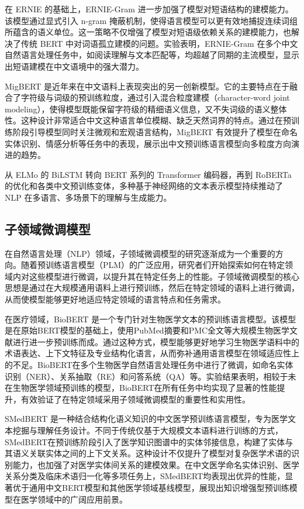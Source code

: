 \documentclass[12pt, a4paper]{ctexart}
\begin{document}
在 ERNIE 的基础上，ERNIE-Gram 进一步加强了模型对短语结构的建模能力。该模型通过显式引入 n-gram 掩蔽机制，使得语言模型可以更有效地捕捉连续词组所蕴含的语义单位。这一策略不仅增强了模型对短语级依赖关系的建模能力，也解决了传统 BERT 中对词语孤立建模的问题。实验表明，ERNIE-Gram 在多个中文自然语言处理任务中，如阅读理解与文本匹配等，均超越了同期的主流模型\cite{xiao2021erniegrampretrainingexplicitlyngram}，显示出短语建模在中文语境中的强大潜力。

MigBERT 是近年来在中文语料上表现突出的另一创新模型。它的主要特点在于融合了字符级与词级的预训练粒度，通过引入混合粒度建模（character-word joint modeling），使得模型既能保留字符级的精细语义信息，又不失词级的语义整体性。这种设计非常适合中文这种语言单位模糊、缺乏天然词界的特点。通过在预训练阶段引导模型同时关注微观和宏观语言结构，MigBERT 有效提升了模型在命名实体识别、情感分析等任务中的表现，展示出中文预训练语言模型向多粒度方向演进的趋势\cite{liang2023characterwordbothrevisiting}。

从 ELMo 的 BiLSTM 转向 BERT 系列的 Transformer 编码器，再到 RoBERTa 的优化和各类中文预训练变体，多种基于神经网络的文本表示模型持续推动了 NLP 在多语言、多场景下的理解与生成能力。

\subsection{子领域微调模型}

在自然语言处理（NLP）领域，子领域微调模型的研究逐渐成为一个重要的方向。随着预训练语言模型（PLM）的广泛应用，研究者们开始探索如何在特定领域内对这些模型进行微调，以提升其在特定任务上的性能。子领域微调模型的核心思想是通过在大规模通用语料上进行预训练，然后在特定领域的语料上进行微调，从而使模型能够更好地适应特定领域的语言特点和任务需求。

在医疗领域，BioBERT 是一个专门针对生物医学文本的预训练语言模型\cite{Lee_2019}。该模型是在原始BERT模型的基础上，使用PubMed摘要和PMC全文等大规模生物医学文献进行进一步预训练而成。通过这种方式，模型能够更好地学习生物医学语料中的术语表达、上下文特征及专业结构化语言，从而弥补通用语言模型在领域适应性上的不足。BioBERT在多个生物医学自然语言处理任务中进行了微调，如命名实体识别（NER）、关系抽取（RE）和问答系统（QA）等。实验结果表明，相较于未在生物医学领域预训练的模型，BioBERT在所有任务中均实现了显著的性能提升，有效验证了在特定领域采用子领域微调模型的重要性和实用性。

SMedBERT 是一种结合结构化语义知识的中文医学预训练语言模型，专为医学文本挖掘与理解任务设计。不同于传统仅基于大规模文本语料进行训练的方式，SMedBERT在预训练阶段引入了医学知识图谱中的实体邻接信息，构建了实体与其语义关联实体之间的上下文关系。这种设计不仅提升了模型对复杂医学术语的识别能力，也加强了对医学实体间关系的建模效果\cite{zhang2021smedbertknowledgeenhancedpretrainedlanguage}。在中文医学命名实体识别、医学关系分类及临床术语归一化等多项任务上，SMedBERT均表现出优异的性能，显著优于通用中文BERT模型和其他医学领域基线模型，展现出知识增强型预训练模型在医学领域中的广阔应用前景。
\end{document}

